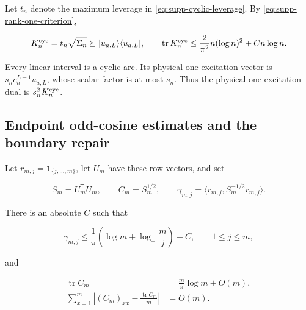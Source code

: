Let \(t_n\) denote the maximum leverage in
\eqref{eq:supp-cyclic-leverage}.  By
\eqref{eq:supp-rank-one-criterion},

\begin{equation}\label{eq:supp-cyclic-certificate}
 K_n^{\rm cyc}=t_n\sqrt{\Sigma_n}
 \succeq|u_{a,L}\rangle\langle u_{a,L}|,
 \qquad
 \operatorname{tr}K_n^{\rm cyc}
 \le\frac{2}{\pi^2}n(\log n)^2+Cn\log n.
\end{equation}

Every linear interval is a cyclic arc.  Its physical one-excitation vector is
\(s_nc_n^{L-1}u_{a,L}\), whose scalar factor is at most \(s_n\).  Thus the
physical one-excitation dual is \(s_n^2K_n^{\rm cyc}\).

\subsection{Endpoint odd-cosine estimates and the boundary repair}

Let \(r_{m,j}=\mathbf1_{\{j,\ldots,m\}}\), let \(U_m\) have these row
vectors, and set

\begin{equation}\label{eq:supp-volterra-definitions}
 S_m=U_m^{\mathsf T}U_m,
 \qquad C_m=S_m^{1/2},
 \qquad
 \gamma_{m,j}=\langle r_{m,j},S_m^{-1/2}r_{m,j}\rangle.
\end{equation}

\begin{lemma}
\label{lem:supp-odd-cosine}
There is an absolute \(C\) such that

\begin{equation}\label{eq:supp-leverage-profile}
 \gamma_{m,j}\le\frac1\pi
 \left(\log m+\log_+\frac mj\right)+C,
 \qquad1\le j\le m,
\end{equation}

and

\begin{align}
 \operatorname{tr}C_m&=\frac m\pi\log m+O(m),
 \label{eq:supp-cm-trace}\\
 \sum_{x=1}^m\left|(C_m)_{xx}
 -\frac{\operatorname{tr}C_m}{m}\right|&=O(m).
 \label{eq:supp-cm-flatness}
\end{align}
\end{lemma}

